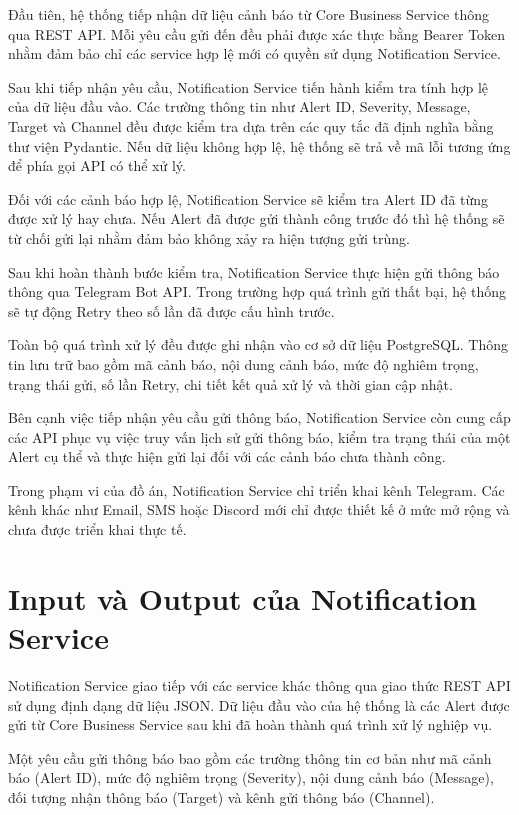 Đầu tiên, hệ thống tiếp nhận dữ liệu cảnh báo từ Core Business Service thông qua REST API. Mỗi yêu cầu gửi đến đều phải được xác thực bằng Bearer Token nhằm đảm bảo chỉ các service hợp lệ mới có quyền sử dụng Notification Service.

Sau khi tiếp nhận yêu cầu, Notification Service tiến hành kiểm tra tính hợp lệ của dữ liệu đầu vào. Các trường thông tin như Alert ID, Severity, Message, Target và Channel đều được kiểm tra dựa trên các quy tắc đã định nghĩa bằng thư viện Pydantic. Nếu dữ liệu không hợp lệ, hệ thống sẽ trả về mã lỗi tương ứng để phía gọi API có thể xử lý.

Đối với các cảnh báo hợp lệ, Notification Service sẽ kiểm tra Alert ID đã từng được xử lý hay chưa. Nếu Alert đã được gửi thành công trước đó thì hệ thống sẽ từ chối gửi lại nhằm đảm bảo không xảy ra hiện tượng gửi trùng.

Sau khi hoàn thành bước kiểm tra, Notification Service thực hiện gửi thông báo thông qua Telegram Bot API. Trong trường hợp quá trình gửi thất bại, hệ thống sẽ tự động Retry theo số lần đã được cấu hình trước.

Toàn bộ quá trình xử lý đều được ghi nhận vào cơ sở dữ liệu PostgreSQL. Thông tin lưu trữ bao gồm mã cảnh báo, nội dung cảnh báo, mức độ nghiêm trọng, trạng thái gửi, số lần Retry, chi tiết kết quả xử lý và thời gian cập nhật.

Bên cạnh việc tiếp nhận yêu cầu gửi thông báo, Notification Service còn cung cấp các API phục vụ việc truy vấn lịch sử gửi thông báo, kiểm tra trạng thái của một Alert cụ thể và thực hiện gửi lại đối với các cảnh báo chưa thành công.

Trong phạm vi của đồ án, Notification Service chỉ triển khai kênh Telegram. Các kênh khác như Email, SMS hoặc Discord mới chỉ được thiết kế ở mức mở rộng và chưa được triển khai thực tế.


\section{Input và Output của Notification Service}

Notification Service giao tiếp với các service khác thông qua giao thức REST API sử dụng định dạng dữ liệu JSON. Dữ liệu đầu vào của hệ thống là các Alert được gửi từ Core Business Service sau khi đã hoàn thành quá trình xử lý nghiệp vụ.

Một yêu cầu gửi thông báo bao gồm các trường thông tin cơ bản như mã cảnh báo (Alert ID), mức độ nghiêm trọng (Severity), nội dung cảnh báo (Message), đối tượng nhận thông báo (Target) và kênh gửi thông báo (Channel).

